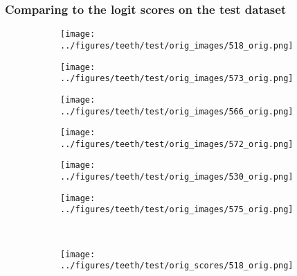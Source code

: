 \subsubsection{Comparing to the logit scores on the test dataset}
\begin{figure}[h!]
	\begin{subfigure}[b]{0.03\textwidth} %
		\centering
	\end{subfigure}
	\begin{subfigure}{0.15\textwidth}
		\centering
		\texttt{[image: ../figures/teeth/test/orig\_images/518\_orig.png]}
		\label{fig:1}
	\end{subfigure}
	\begin{subfigure}{0.15\textwidth}
		\centering
		\texttt{[image: ../figures/teeth/test/orig\_images/573\_orig.png]}
		\label{fig:1}
	\end{subfigure}
	\begin{subfigure}{0.15\textwidth}
		\centering
		\texttt{[image: ../figures/teeth/test/orig\_images/566\_orig.png]}
		\label{fig:1}
	\end{subfigure}
	\begin{subfigure}{0.15\textwidth}
		\centering
		\texttt{[image: ../figures/teeth/test/orig\_images/572\_orig.png]}
		\label{fig:1}
	\end{subfigure}
	\begin{subfigure}{0.15\textwidth}
		\centering
		\texttt{[image: ../figures/teeth/test/orig\_images/530\_orig.png]}
		\label{fig:1}
	\end{subfigure}
	\begin{subfigure}{0.15\textwidth}
		\centering
		\texttt{[image: ../figures/teeth/test/orig\_images/575\_orig.png]}
		\label{fig:1}
	\end{subfigure}
	\vspace{-0.35cm}
	\\
		\begin{subfigure}[b]{0.03\textwidth} %
		\centering
	\end{subfigure}
	\begin{subfigure}{0.15\textwidth}
		\centering
		\texttt{[image: ../figures/teeth/test/orig\_scores/518\_orig.png]}
		\label{fig:1}
	\end{subfigure}

\end{figure}
